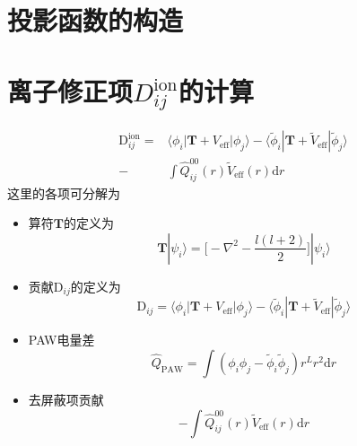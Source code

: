 \section{投影函数的构造}

\section{离子修正项$D_{ij}^{\mathrm{ion}}$的计算}
\begin{equation}
	\begin{aligned}
		\mathrm{D}_{ij}^{\mathrm{ion}}=&\langle\phi_i|\mathbf{T}+V_{\mathrm{eff}}|\phi_j\rangle - \langle\tilde{\phi}_i|\mathbf{T}+\tilde{V}_{\mathrm{eff}}|\tilde{\phi}_j\rangle\\
		-&\int\hat{Q}_{ij}^{00}(r)\tilde{V}_{\mathrm{eff}}(r)\mathrm{d}r
	\end{aligned}
	\label{eq:DION}
\end{equation}
这里的各项可分解为
\begin{itemize}
	\item 算符$\mathbf{T}$的定义为
\begin{equation}
	\mathbf{T}|\psi_i\rangle=\bigg[-\nabla^2-\dfrac{l(l+2)}2\bigg]|\psi_i\rangle
	\label{eq:Kinetic}
\end{equation}
\item 贡献$\mathrm{D}_{ij}$的定义为
	\begin{equation}
		\mathrm{D}_{ij} = \langle\phi_i|\mathbf{T}+V_{\mathrm{eff}}|\phi_j\rangle - \langle\tilde{\phi}_i|\mathbf{T}+\tilde{V}_{\mathrm{eff}}|\tilde{\phi}_j\rangle
		\label{eq:DIJ}
	\end{equation}
\item \textrm{PAW}电量差
	\begin{equation}
		\hat{Q}_{\mathrm{PAW}}=\int(\phi_i\phi_j-\tilde{\phi}_i\tilde{\phi}_j)r^Lr^2\mathrm{d}r
		\label{eq:Q-PAW}
	\end{equation}
\item 去屏蔽项贡献
	\begin{equation}
		-\int\hat{Q}^{00}_{ij}(r)\tilde{V}_{\mathrm{eff}}(r)\mathrm{d}r
		\label{eq:unsreened}
	\end{equation}
\end{itemize}


